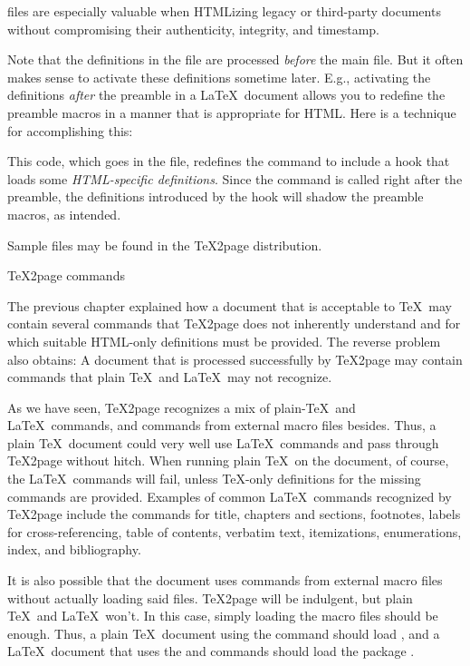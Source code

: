  files are especially valuable when HTMLizing
legacy or third-party documents without compromising
their authenticity, integrity, and timestamp.

Note that the definitions in the  file
are processed {\em before} the main file.  But it often
makes sense to activate these definitions sometime
later.  E.g., activating the  definitions {\em
after} the preamble in a \LaTeX\ document allows you to
redefine the preamble macros in a manner that is
appropriate for HTML.  Here is a technique for
accomplishing this:

%

\n This code, which goes in the  file,
redefines the \p{\document} command to include a
hook that loads some {\em HTML-specific definitions}.
Since the \p{\document} command is called right after
the preamble, the definitions introduced by  the hook
will shadow the preamble macros, as intended.

Sample  files may be found in the \TeX2page
distribution.

  \TeX2page commands

The previous chapter explained how a document that is
acceptable to \TeX\ may contain several commands that
\TeX2page does not inherently
understand and for which suitable HTML-only definitions
must be provided.  The reverse problem also obtains: A
document that is processed successfully by \TeX2page
may contain commands that plain \TeX\ and \LaTeX\ may not
recognize.

As we have seen, \TeX2page recognizes a mix of plain-\TeX\ and \LaTeX\
commands, and commands from external macro files besides.
Thus,
a plain \TeX\ document could very well use \LaTeX\
commands and pass through \TeX2page without hitch.  When
running plain \TeX\ on the document, of course, the \LaTeX\
commands will fail, unless \TeX-only definitions for the
missing commands are provided.  Examples of common \LaTeX\
commands recognized by \TeX2page include the commands for
title, chapters and sections, footnotes,  labels for
cross-referencing, table of contents,  verbatim text,
itemizations, enumerations,
index, and bibliography.

It is also possible that the
document uses commands from external macro files
without actually loading said files.  \TeX2page will be
indulgent, but plain \TeX\ and \LaTeX\ won't.
In this case,
simply loading the macro files should be
enough.    Thus, a plain \TeX\ document using the \p{\cite}
command should load \p{btxmac.tex}, and   a \LaTeX\ document that uses
the \p{\color} and \p{\definecolor} commands should load the package
\p{color.sty}.

